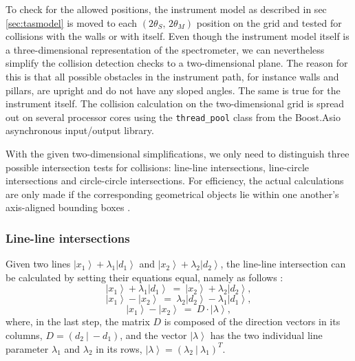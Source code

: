 To check for the allowed positions, the instrument model as described in sec \ref{sec:tasmodel} is moved to
each $\left( 2\theta_S,\, 2\theta_M \right)$ position on the grid and tested for collisions with the walls or with
itself. Even though the instrument model itself is a three-dimensional representation of the spectrometer, we
can nevertheless simplify the collision detection checks to a two-dimensional plane. The reason for this is
that all possible obstacles in the instrument path, for instance walls and pillars, are upright and do not have
any sloped angles. The same is true for the instrument itself.
The collision calculation on the two-dimensional grid is spread out on several processor cores using 
the \lstinline[language=C++]|thread_pool| \cite{web_boost_asio_threadpool} class from the 
Boost.Asio \cite{web_boost_asio} asynchronous input/output library.

With the given two-dimensional simplifications, we only need to distinguish three possible intersection tests for collisions: 
line-line intersections, line-circle intersections and circle-circle intersections. 
For efficiency, the actual calculations are only made if the corresponding geometrical objects lie within 
one another's axis-aligned bounding boxes \cite{web_aabb}.

\subsubsection*{Line-line intersections}
Given two lines $\left|x_1\right> + \lambda_1 \left|d_1\right>$ and $\left|x_2\right> + \lambda_2 \left|d_2\right>$, 
the line-line intersection can be calculated by setting their equations equal, namely as follows \cite{wiki_line_line_intersection}:
\begin{equation}
	\left|x_1\right> + \lambda_1 \left|d_1\right> \ =\ \left|x_2\right> + \lambda_2 \left|d_2\right>,
\end{equation}
\begin{equation}
	\left|x_1\right> - \left|x_2\right> \ =\  \lambda_2 \left|d_2\right> - \lambda_1 \left|d_1\right>,
\end{equation}
\begin{equation}
	\left|x_1\right> - \left|x_2\right> \ =\  D \cdot \left| \lambda \right>,
	\label{eq:line_line_inters}
\end{equation}
where, in the last step, the matrix $D$ is composed of the direction vectors in its columns, $D = \left( d_2 \ |\  -d_1 \right)$, 
and the vector $\left| \lambda \right>$ has the two individual line parameter $\lambda_1$ and $\lambda_2$ in its rows, $\left| \lambda \right> = \left( \lambda_2 \ |\  \lambda_1 \right)^T$.

